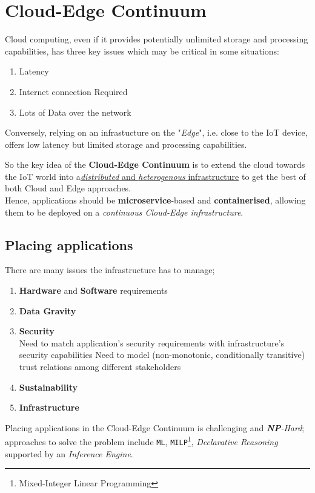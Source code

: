\chapter{Cloud-Edge Continuum}
Cloud computing, even if it provides potentially unlimited storage and processing capabilities, has three key issues which may be critical in some situations:
\begin{enumerate}
   \item Latency
   \item Internet connection Required
   \item Lots of Data over the network
\end{enumerate}
Conversely, relying on an infrastucture on the "\textit{Edge}", i.e. close to the IoT device, offers low latency but limited storage and processing capabilities.


So the key idea of the \textbf{Cloud-Edge Continuum} is to extend the cloud towards the IoT world into a\ul{\textit{distributed} and \textit{heterogenous}
infrastructure} to get the best of both Cloud and Edge approaches.\\
Hence, applications should be \textbf{microservice}-based and \textbf{containerised}, allowing them to be deployed on a \textit{continuous Cloud-Edge infrastructure}.


\section{Placing applications}
There are many issues the infrastructure has to manage;
\begin{enumerate}
   \item \textbf{Hardware} and \textbf{Software} requirements
   \item \textbf{Data Gravity}
   \item \textbf{Security}\\
   Need to match application’s security requirements
   with infrastructure’s security capabilities
   Need to model (non-monotonic, conditionally transitive)
   trust relations among different stakeholders
   \item \textbf{Sustainability}
   \item \textbf{Infrastructure}
\end{enumerate}

Placing applications in the Cloud-Edge Continuum is challenging and \textit{\textbf{NP}-Hard};
approaches to solve the problem include \texttt{ML}, \texttt{MILP}\footnote{Mixed-Integer Linear Programming}, \textit{Declarative Reasoning} supported by an \textit{Inference Engine}.

